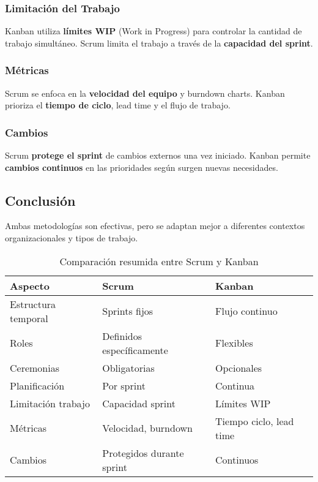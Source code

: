 \subsubsection{Limitación del Trabajo}
Kanban utiliza \textbf{límites WIP} (Work in Progress) para controlar la cantidad de trabajo simultáneo.
Scrum limita el trabajo a través de la \textbf{capacidad del sprint}.

\subsubsection{Métricas}
Scrum se enfoca en la \textbf{velocidad del equipo} y burndown charts.
Kanban prioriza el \textbf{tiempo de ciclo}, lead time y el flujo de trabajo.

\subsubsection{Cambios}
Scrum \textbf{protege el sprint} de cambios externos una vez iniciado.
Kanban permite \textbf{cambios continuos} en las prioridades según surgen nuevas necesidades.

\subsection{Conclusión}
\label{subsec:conclusion-scrum-kanban}
\begin{solucion}
    Ambas metodologías son efectivas, pero se adaptan mejor a diferentes contextos organizacionales y tipos de trabajo.
\end{solucion}

\begin{table}[h]
    \centering
    \begin{tabular}{@{}p{4cm}p{5cm}p{5cm}@{}}
        \toprule
        \textbf{Aspecto}    & \textbf{Scrum}            & \textbf{Kanban}         \\
        \midrule
        Estructura temporal & Sprints fijos             & Flujo continuo          \\
        Roles               & Definidos específicamente & Flexibles               \\
        Ceremonias          & Obligatorias              & Opcionales              \\
        Planificación       & Por sprint                & Continua                \\
        Limitación trabajo  & Capacidad sprint          & Límites WIP             \\
        Métricas            & Velocidad, burndown       & Tiempo ciclo, lead time \\
        Cambios             & Protegidos durante sprint & Continuos               \\
        \bottomrule
    \end{tabular}
    \caption{Comparación resumida entre Scrum y Kanban}\label{tab:comparacion-scrum-kanban}
\end{table}
